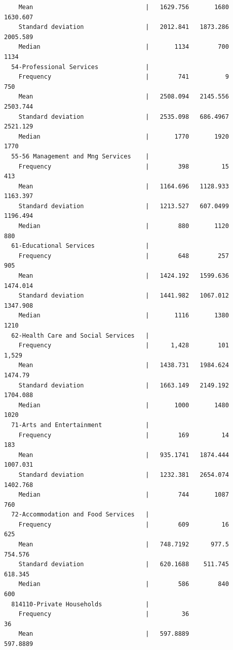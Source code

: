 \documentclass[
]{book}
\begin{document}
\begin{verbatim}
    Mean                               |   1629.756       1680   1630.607
    Standard deviation                 |   2012.841   1873.286   2005.589
    Median                             |       1134        700       1134
  54-Professional Services             |                                 
    Frequency                          |        741          9        750
    Mean                               |   2508.094   2145.556   2503.744
    Standard deviation                 |   2535.098   686.4967   2521.129
    Median                             |       1770       1920       1770
  55-56 Management and Mng Services    |                                 
    Frequency                          |        398         15        413
    Mean                               |   1164.696   1128.933   1163.397
    Standard deviation                 |   1213.527   607.0499   1196.494
    Median                             |        880       1120        880
  61-Educational Services              |                                 
    Frequency                          |        648        257        905
    Mean                               |   1424.192   1599.636   1474.014
    Standard deviation                 |   1441.982   1067.012   1347.908
    Median                             |       1116       1380       1210
  62-Health Care and Social Services   |                                 
    Frequency                          |      1,428        101      1,529
    Mean                               |   1438.731   1984.624    1474.79
    Standard deviation                 |   1663.149   2149.192   1704.088
    Median                             |       1000       1480       1020
  71-Arts and Entertainment            |                                 
    Frequency                          |        169         14        183
    Mean                               |   935.1741   1874.444   1007.031
    Standard deviation                 |   1232.381   2654.074   1402.768
    Median                             |        744       1087        760
  72-Accommodation and Food Services   |                                 
    Frequency                          |        609         16        625
    Mean                               |   748.7192      977.5    754.576
    Standard deviation                 |   620.1688    511.745    618.345
    Median                             |        586        840        600
  814110-Private Households            |                                 
    Frequency                          |         36                    36
    Mean                               |   597.8889              597.8889

\end{verbatim}
\end{document}
